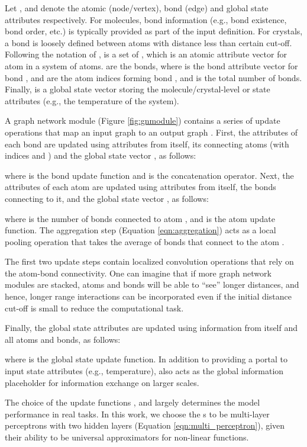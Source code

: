 \documentclass[manuscript=article]{achemso}
\begin{document}
Let ,  and  denote the atomic (node/vertex), bond (edge) and global state attributes respectively. For molecules, bond information (e.g., bond existence, bond order, etc.) is typically provided as part of the input definition. For crystals, a bond is loosely defined between atoms with distance less than certain cut-off. Following the notation of \citet{Battaglia2018},  is a set of , which is an atomic attribute vector for atom  in a system of  atoms.  are the bonds, where  is the bond attribute vector for bond ,  and  are the atom indices forming bond , and  is the total number of bonds. Finally,  is a global state vector storing the molecule/crystal-level or state attributes (e.g., the temperature of the system).

A graph network module (Figure \ref{fig:gnmodule}) contains a series of update operations that map an input graph  to an output graph . First, the attributes of each bond  are updated using attributes from itself, its connecting atoms (with indices  and  ) and the global state vector , as follows:


where  is the bond update function and  is the concatenation operator. Next, the attributes of each atom  are updated using attributes from itself, the bonds connecting to it, and the global state vector , as follows:


where  is the number of bonds connected to atom , and  is the atom update function. The aggregation step (Equation \ref{eqn:aggregation}) acts as a local pooling operation that takes the average of bonds that connect to the atom . 

The first two update steps contain localized convolution operations that rely on the atom-bond connectivity. One can imagine that if more graph network modules are stacked, atoms and bonds will be able to ``see'' longer distances, and hence, longer range interactions can be incorporated even if the initial distance cut-off is small to reduce the computational task. 

Finally, the global state attributes  are updated using information from itself and all atoms and bonds, as follows:


where  is the global state update function. In addition to providing a portal to input state attributes (e.g., temperature),  also acts as the global information placeholder for information exchange on larger scales. 

The choice of the update functions ,  and  largely determines the model performance in real tasks. In this work, we choose the s to be multi-layer perceptrons with two hidden layers (Equation \ref{eqn:multi_perceptron}), given their ability to be universal approximators for non-linear functions.\cite{Hornik1989} 
\end{document}
